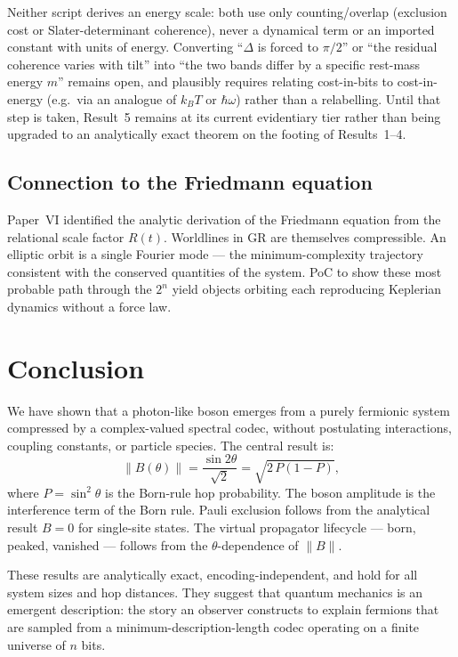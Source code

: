 \documentclass[11pt]{article}
\begin{document}
Neither script derives an energy scale: both use only counting/overlap
(exclusion cost or Slater-determinant coherence), never a dynamical term or
an imported constant with units of energy. Converting ``$\Delta$ is forced
to $\pi/2$'' or ``the residual coherence varies with tilt'' into ``the two
bands differ by a specific rest-mass energy $m$'' remains open, and
plausibly requires relating cost-in-bits to cost-in-energy (e.g.\ via an
analogue of $k_BT$ or $\hbar\omega$) rather than a relabelling. Until that
step is taken, Result~5 remains at its current evidentiary tier rather than
being upgraded to an analytically exact theorem on the footing of
Results~1--4.

\subsection{Connection to the Friedmann equation}

Paper~VI identified the analytic derivation of the Friedmann equation from
the relational scale factor $R(t)$. Worldlines in GR are themselves compressible.
An elliptic orbit is a single Fourier mode --- the minimum-complexity trajectory
consistent with the conserved quantities of the system. PoC to show
these most probable path through the $2^n$ yield objects orbiting each
reproducing Keplerian dynamics without a force law.



\section{Conclusion}
\label{sec:conclusion}

We have shown that a photon-like boson emerges from a purely fermionic system
compressed by a complex-valued spectral codec, without postulating interactions,
coupling constants, or particle species.
The central result is:
\[
  \|B(\theta)\| = \frac{\sin 2\theta}{\sqrt{2}} = \sqrt{2\,P(1-P)},
\]
where $P = \sin^2\theta$ is the Born-rule hop probability.
The boson amplitude is the interference term of the Born rule.
Pauli exclusion follows from the analytical result $B = 0$ for single-site
states.
The virtual propagator lifecycle --- born, peaked, vanished --- follows from
the $\theta$-dependence of $\|B\|$.

These results are analytically exact, encoding-independent, and hold for all
system sizes and hop distances.
They suggest that quantum mechanics is an emergent description: the story
an observer constructs to explain fermions that are sampled from a
minimum-description-length codec operating on a finite universe of $n$ bits.
\end{document}

